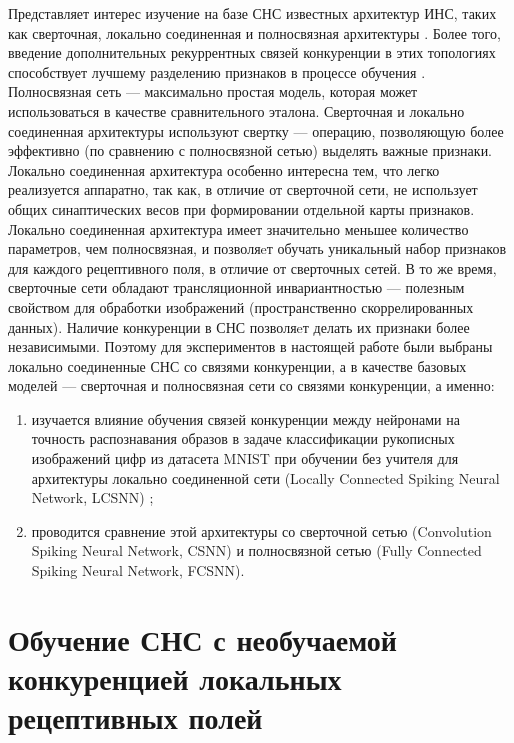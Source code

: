 \documentclass[a4paper]{article}
\begin{document}
Представляет интерес изучение на базе СНС известных архитектур ИНС, таких как сверточная, локально соединенная и полносвязная архитектуры \cite{Khan_2020}. Более того, введение дополнительных рекуррентных связей конкуренции в этих топологиях способствует лучшему разделению признаков в  процессе обучения \cite{MaxActiv1, MaxActiv2}. Полносвязная сеть --- максимально простая модель, которая может использоваться в качестве сравнительного эталона. Сверточная и локально соединенная архитектуры используют свертку --- операцию, позволяющую более эффективно (по сравнению с полносвязной сетью) выделять важные признаки. Локально соединенная архитектура особенно интересна тем, что легко реализуется аппаратно, так как, в отличие от сверточной сети, не использует общих синаптических весов при формировании отдельной карты признаков. Локально соединенная архитектура имеет значительно меньшее количество параметров, чем полносвязная, и позволяeт обучать уникальный набор признаков для каждого рецептивного поля, в отличие от сверточных сетей. В то же время, сверточные сети обладают трансляционной инвариантностью --- полезным свойством для обработки изображений (пространственно скоррелированных данных). Наличие конкуренции в СНС позволяeт делать их признаки более независимыми. Поэтому для экспериментов в настоящей работе были выбраны локально соединенные СНС со связями конкуренции, а в качестве базовых моделей --- сверточная и полносвязная сети со связями конкуренции, а именно:

\begin{enumerate}[i]
\item изучается влияние обучения связей конкуренции \cite{MaxActiv1, MaxActiv2, hardware_survey} между нейронами на точность распознавания образов в задаче классификации рукописных изображений цифр из датасета MNIST \cite{MNIST} при обучении без учителя для архитектуры локально соединенной сети (Locally Connected Spiking Neural Network, LCSNN) \cite{saunders2019locally}; 

\item проводится сравнение этой архитектуры со сверточной сетью (Convolution Spiking Neural Network, CSNN) и полносвязной сетью (Fully Connected Spiking Neural Network, FCSNN).

\end{enumerate}


\clearpage

\section{Обучение СНС с необучаемой конкуренцией локальных рецептивных полей}
\end{document}
